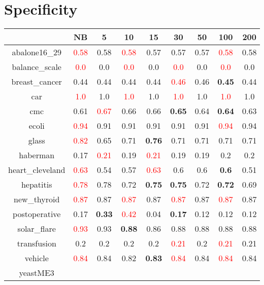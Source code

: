 \documentclass{article}%
\begin{document}
\section*{Specificity}%
\begin{tabular}{c|cccccccc}%
\hline%
&NB&5&10&15&30&50&100&200\\%
\hline%
abalone16\_29&\textcolor{red}{ 
0.58
}&0.58&\textcolor{red}{ 
0.58
}&0.57&0.57&0.57&\textcolor{red}{ 
0.58
}&0.58\\%
\hline%
balance\_scale&\textcolor{red}{ 
0.0
}&0.0&\textcolor{red}{ 
0.0
}&0.0&\textcolor{red}{ 
0.0
}&0.0&\textcolor{red}{ 
0.0
}&0.0\\%
\hline%
breast\_cancer&0.44&0.44&0.44&0.44&\textcolor{red}{ 
0.46
}&0.46&\textbf{0.45}&0.44\\%
\hline%
car&\textcolor{red}{ 
1.0
}&1.0&\textcolor{red}{ 
1.0
}&1.0&\textcolor{red}{ 
1.0
}&1.0&\textcolor{red}{ 
1.0
}&1.0\\%
\hline%
cmc&0.61&\textcolor{red}{ 
0.67
}&0.66&0.66&\textbf{0.65}&0.64&\textbf{0.64}&0.63\\%
\hline%
ecoli&\textcolor{red}{ 
0.94
}&0.91&0.91&0.91&0.91&0.91&\textcolor{red}{ 
0.94
}&0.94\\%
\hline%
glass&\textcolor{red}{ 
0.82
}&0.65&0.71&\textbf{0.76}&0.71&0.71&0.71&0.71\\%
\hline%
haberman&0.17&\textcolor{red}{ 
0.21
}&0.19&\textcolor{red}{ 
0.21
}&0.19&0.19&0.2&0.2\\%
\hline%
heart\_cleveland&\textcolor{red}{ 
0.63
}&0.54&0.57&\textcolor{red}{ 
0.63
}&0.6&0.6&\textbf{0.6}&0.51\\%
\hline%
hepatitis&\textcolor{red}{ 
0.78
}&0.78&0.72&\textbf{0.75}&\textbf{0.75}&0.72&\textbf{0.72}&0.69\\%
\hline%
new\_thyroid&\textcolor{red}{ 
0.87
}&0.87&\textcolor{red}{ 
0.87
}&0.87&\textcolor{red}{ 
0.87
}&0.87&\textcolor{red}{ 
0.87
}&0.87\\%
\hline%
postoperative&0.17&\textbf{0.33}&\textcolor{red}{ 
0.42
}&0.04&\textbf{0.17}&0.12&0.12&0.12\\%
\hline%
solar\_flare&\textcolor{red}{ 
0.93
}&0.93&\textbf{0.88}&0.86&0.88&0.88&0.88&0.88\\%
\hline%
transfusion&0.2&0.2&0.2&0.2&\textcolor{red}{ 
0.21
}&0.2&\textcolor{red}{ 
0.21
}&0.21\\%
\hline%
vehicle&\textcolor{red}{ 
0.84
}&0.84&0.82&\textbf{0.83}&\textcolor{red}{ 
0.84
}&0.84&\textcolor{red}{ 
0.84
}&0.84\\%
\hline%
yeastME3&\textcolor{red}{ 
}
\end{tabular}
\end{document}
